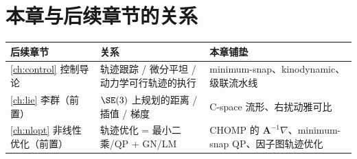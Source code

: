 \section*{本章与后续章节的关系}
\begin{table}[H]\centering\small
\begin{tabularx}{\linewidth}{lLL}
\toprule
后续章节 & 关系 & 本章铺垫 \\
\midrule
\cref{ch:control} 控制导论 & 轨迹跟踪 / 微分平坦 / 动力学可行轨迹的执行 & minimum-snap、kinodynamic、级联流水线 \\
\cref{ch:lie} 李群（前置） & $\SE(3)$ 上规划的距离 / 插值 / 梯度 & C-space 流形、右扰动雅可比 \\
\cref{ch:nlopt} 非线性优化（前置） & 轨迹优化 = 最小二乘/QP + GN/LM & CHOMP 的 $\mathbf{A}^{-1}\nabla$、minimum-snap QP、因子图轨迹优化 \\
\bottomrule
\end{tabularx}
\end{table}

